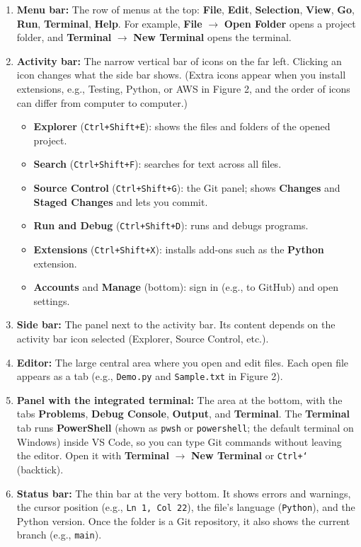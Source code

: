 \documentclass[11pt,a4paper]{article}
\newcommand{\code}[1]{\texttt{#1}}
\newcommand{\menu}[1]{\textsf{\textbf{#1}}}
\begin{document}
\begin{enumerate}
\item \textbf{Menu bar:} The row of menus at the top: \menu{File}, \menu{Edit}, \menu{Selection}, \menu{View}, \menu{Go}, \menu{Run}, \menu{Terminal}, \menu{Help}. For example, \menu{File} $\rightarrow$ \menu{Open Folder} opens a project folder, and \menu{Terminal} $\rightarrow$ \menu{New Terminal} opens the terminal.
\item \textbf{Activity bar:} The narrow vertical bar of icons on the far left. Clicking an icon changes what the side bar shows. (Extra icons appear when you install extensions, e.g., Testing, Python, or AWS in Figure 2, and the order of icons can differ from computer to computer.)
  \begin{itemize}
  \item \textbf{Explorer} (\code{Ctrl+Shift+E}): shows the files and folders of the opened project.
  \item \textbf{Search} (\code{Ctrl+Shift+F}): searches for text across all files.
  \item \textbf{Source Control} (\code{Ctrl+Shift+G}): the Git panel; shows \textbf{Changes} and \textbf{Staged Changes} and lets you commit.
  \item \textbf{Run and Debug} (\code{Ctrl+Shift+D}): runs and debugs programs.
  \item \textbf{Extensions} (\code{Ctrl+Shift+X}): installs add-ons such as the \textbf{Python} extension.
  \item \textbf{Accounts} and \textbf{Manage} (bottom): sign in (e.g., to GitHub) and open settings.
  \end{itemize}
\item \textbf{Side bar:} The panel next to the activity bar. Its content depends on the activity bar icon selected (Explorer, Source Control, etc.).
\item \textbf{Editor:} The large central area where you open and edit files. Each open file appears as a tab (e.g., \code{Demo.py} and \code{Sample.txt} in Figure 2).
\item \textbf{Panel with the integrated terminal:} The area at the bottom, with the tabs \textbf{Problems}, \textbf{Debug Console}, \textbf{Output}, and \textbf{Terminal}. The \textbf{Terminal} tab runs \textbf{PowerShell} (shown as \code{pwsh} or \code{powershell}; the default terminal on Windows) inside VS Code, so you can type Git commands without leaving the editor. Open it with \menu{Terminal} $\rightarrow$ \menu{New Terminal} or \code{Ctrl+`} (backtick).
\item \textbf{Status bar:} The thin bar at the very bottom. It shows errors and warnings, the cursor position (e.g., \code{Ln 1, Col 22}), the file's language (\code{Python}), and the Python version. Once the folder is a Git repository, it also shows the current branch (e.g., \code{main}).
\end{enumerate}
\end{document}
